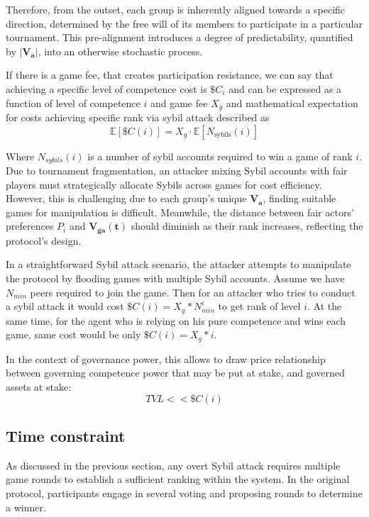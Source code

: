 \documentclass{article}
\begin{document}
\begin{CJK}{UTF8}{gbsn}
\begin{multicols}{2}
        Therefore, from the outset, each group is inherently aligned towards a specific direction, determined by the free will of its members to participate in a particular tournament. This pre-alignment introduces a degree of predictability, quantified by $|\mathbf{V_a}|$, into an otherwise stochastic process.


        If there is a game fee, that creates participation resistance, we can say that achieving a specific level of competence cost is $\$C_i$ and can be expressed as a function of level of competence $i$ and game fee $X_g$ and mathematical expectation for costs achieving specific rank via sybil attack described as
        $$\mathbb{E}[\$C(i)] = X_g \cdot \mathbb{E}[N_{\text{sybils}}(i)]$$


        Where $N_{sybils}(i)$ is a number of sybil accounts required to win a game of rank $i$. Due to tournament fragmentation, an attacker mixing Sybil accounts with fair players must strategically allocate Sybils across games for cost efficiency. However, this is challenging due to each group's unique $\mathbf{V_a}$, finding suitable games for manipulation is difficult.  Meanwhile, the distance between fair actors' preferences $P_i$ and $\mathbf{V_{ga}(t)}$ should diminish as their rank increases, reflecting the protocol's design.

        In a straightforward Sybil attack scenario, the attacker attempts to manipulate the protocol by flooding games with multiple Sybil accounts.
        Assume we have $N_{min}$ peers required to join the game. Then for an attacker who tries to conduct a sybil attack it would cost
        $\$C(i) = X_g*N_{min}^i$ to get rank of level $i$. At the same time, for the agent who is relying on his pure competence and wins each game, same cost would be only $\$C(i) = X_g*i$.

        In the context of governance power, this allows to draw price relationship between governing competence power that may be put at stake, and governed assets at stake: $$TVL << \$C(i)$$

        \subsection{Time constraint}

        As discussed in the previous section, any overt Sybil attack requires multiple game rounds to establish a sufficient ranking within the system. In the original protocol, participants engage in several voting and proposing rounds to determine a winner.


\end{multicols}
\end{CJK}
\end{document}
